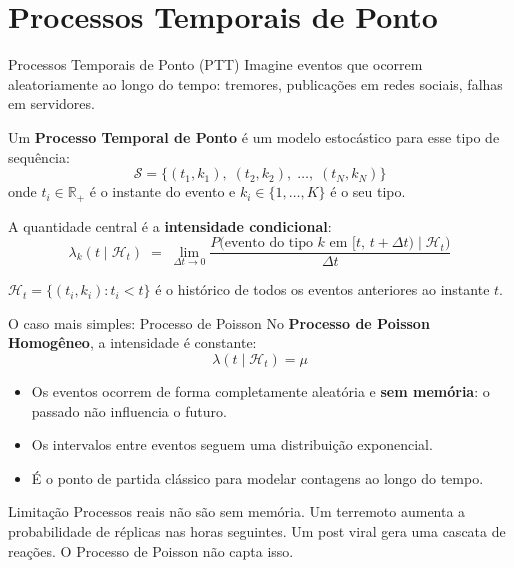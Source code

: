 \documentclass[aspectratio=169]{beamer}
\begin{document}
\section{Processos Temporais de Ponto}

\begin{frame}{Processos Temporais de Ponto (PTT)}
  Imagine eventos que ocorrem aleatoriamente ao longo do tempo: tremores,
  publicações em redes sociais, falhas em servidores.

  \vspace{0.5em}
  Um \textbf{Processo Temporal de Ponto} é um modelo estocástico para
  esse tipo de sequência:
  \[
    \mathcal{S} = \{(t_1, k_1),\; (t_2, k_2),\; \ldots,\; (t_N, k_N)\}
  \]
  onde $t_i \in \mathbb{R}_+$ é o instante do evento e
  $k_i \in \{1, \ldots, K\}$ é o seu tipo.

  \vspace{0.5em}
  A quantidade central é a \textbf{intensidade condicional}:
  \[
    \lambda_k(t \mid \mathcal{H}_t) \;=\; \lim_{\Delta t \to 0}
      \frac{P\bigl(\text{evento do tipo } k \text{ em }
            [t,\, t{+}\Delta t) \mid \mathcal{H}_t\bigr)}{\Delta t}
  \]
  \begin{block}{}
    $\mathcal{H}_t = \{(t_i, k_i) : t_i < t\}$ é o histórico de todos os
    eventos anteriores ao instante $t$.
  \end{block}
\end{frame}

\begin{frame}{O caso mais simples: Processo de Poisson}
  No \textbf{Processo de Poisson Homogêneo}, a intensidade é constante:
  \[
    \lambda(t \mid \mathcal{H}_t) = \mu
  \]
  \begin{itemize}
    \item Os eventos ocorrem de forma completamente aleatória e
          \textbf{sem memória}: o passado não influencia o futuro.
    \item Os intervalos entre eventos seguem uma distribuição exponencial.
    \item É o ponto de partida clássico para modelar contagens ao longo
          do tempo.
  \end{itemize}
  \vspace{0.4em}
  \begin{alertblock}{Limitação}
    Processos reais não são sem memória. Um terremoto aumenta a
    probabilidade de réplicas nas horas seguintes. Um post viral gera
    uma cascata de reações. O Processo de Poisson não capta isso.
  \end{alertblock}
\end{frame}
\end{document}
